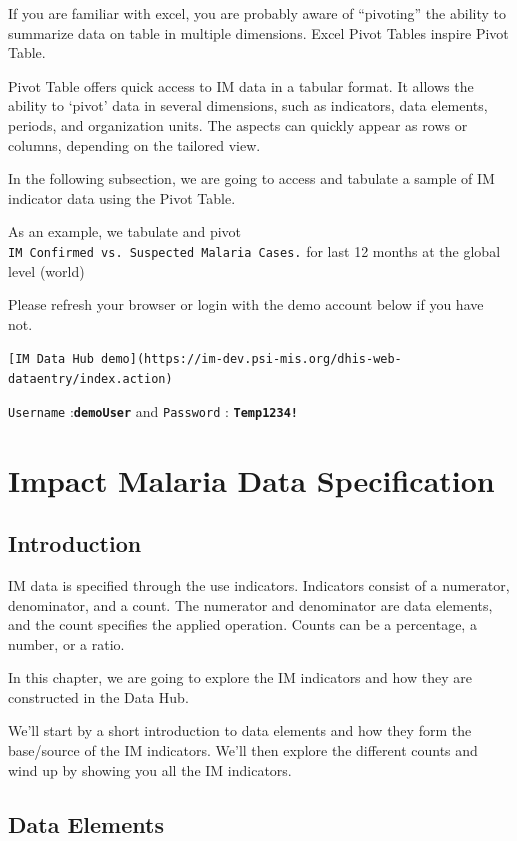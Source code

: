 \documentclass[]{book}
\begin{document}
If you are familiar with excel, you are probably aware of ``pivoting'' the ability to summarize data on table in multiple dimensions. Excel Pivot Tables inspire Pivot Table.

Pivot Table offers quick access to IM data in a tabular format. It allows the ability to `pivot' data in several dimensions, such as indicators, data elements, periods, and organization units. The aspects can quickly appear as rows or columns, depending on the tailored view.

In the following subsection, we are going to access and tabulate a sample of IM indicator data using the Pivot Table.

As an example, we tabulate and pivot \texttt{IM\ Confirmed\ vs.\ Suspected\ Malaria\ Cases.} for last 12 months at the global level (world)

Please refresh your browser or login with the demo account below if you have not.

\texttt{{[}IM\ Data\ Hub\ demo{]}(https://im-dev.psi-mis.org/dhis-web-dataentry/index.action)}

\texttt{Username} :\textbf{\texttt{demoUser}} and \texttt{Password} : \textbf{\texttt{Temp1234!}}

\hypertarget{data}{%
\chapter{Impact Malaria Data Specification}\label{data}}

\hypertarget{introduction-1}{%
\section{Introduction}\label{introduction-1}}

IM data is specified through the use indicators. Indicators consist of a numerator, denominator, and a count. The numerator and denominator are data elements, and the count specifies the applied operation. Counts can be a percentage, a number, or a ratio.

In this chapter, we are going to explore the IM indicators and how they are constructed in the Data Hub.

We'll start by a short introduction to data elements and how they form the base/source of the IM indicators. We'll then explore the different counts and wind up by showing you all the IM indicators.

\hypertarget{data-elements-1}{%
\section{Data Elements}\label{data-elements-1}}
\end{document}
